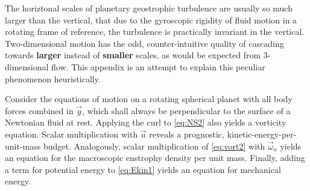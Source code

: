 \label{chap:turbu_categories}

The horiztonal scales of planetary geostrophic turbulence are usually so much
larger than the vertical, that due to the gyroscopic rigidity of fluid motion
in a rotating frame of reference, the turbulence is practically invariant in
the vertical. Two-dimensional motion has the odd, counter-intuitive quality of
cascading towards \textbf{larger} instead of \textbf{smaller} scales, as would be
expected from 3-dimensional flow. This appendix is an attempt to explain
this peculiar phenomenon heuristically.


Consider the equations of motion on a rotating spherical planet with all body forces
combined in $\vec{g}$, which shall always be perpendicular to
the surface of a Newtonian fluid at rest. Applying the curl to \eqref{eq:NS2}
also yields a vorticity equation.
Scalar multiplication with $\vec{u}$ reveals a prognostic, kinetic-energy-per-unit-mass budget.
Analogously, scalar multiplication of \eqref{eq:vort2} with $\vec{\omega}_{a}$ yields an equation
for the macroscopic enstrophy density per unit mass. Finally, adding a term for potential energy to
\eqref{eq:Ekin1} yields an equation for mechanical energy.
\newpage

